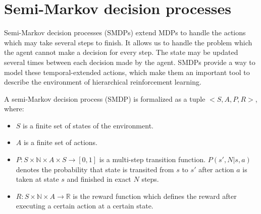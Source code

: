 


\section{Semi-Markov decision processes}
\label{se:SMDP}

Semi-Markov decision processes (SMDPs) \cite{Puterman94} extend MDPs to handle
the actions which may take several steps to finish. It allows us to handle the
problem which the agent cannot make a decision for every step. The state may
be updated several times between each decision made by the agent. SMDPs
provide a way to model these temporal-extended actions, which make them an
important tool to describe the environment of hierarchical reinforcement
learning.

\begin{definition} A semi-Markov decision process (SMDP) is formalized as a tuple $<S, A, P, R>$, where:
\begin{itemize}
    \item $S$ is a finite set of states of the environment.
    \item $A$ is a finite set of actions.
    \item $P:S \times \mathbb{N} \times A \times S \rightarrow [0, 1]$ is a
        multi-step transition function. $P(s', N | s, a)$ denotes the
        probability that state is transited from  $s$ to $s'$ after action $a$
        is taken at state $s$ and finished in exact $N$ steps.
    \item $R:S \times \mathbb{N} \times A \rightarrow \mathbb{R}$ is the reward function which defines the reward after executing a certain action at a certain state.
 \end{itemize}
\end{definition}

